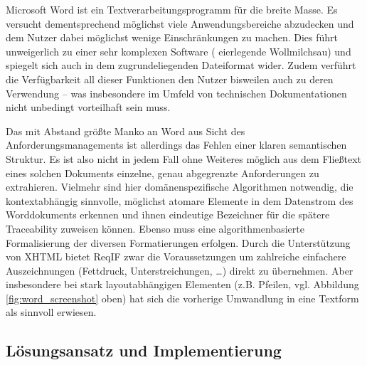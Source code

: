 \documentclass[twoside]{article}
\begin{document}
\begin{multicols}{2}
Microsoft Word ist ein Textverarbeitungsprogramm für die breite Masse. Es versucht dementsprechend möglichst viele Anwendungsbereiche abzudecken und dem Nutzer dabei möglichst wenige Einschränkungen zu machen. Dies führt unweigerlich zu einer sehr komplexen Software (\glqq{} eierlegende Wollmilchsau\grqq{}) und spiegelt sich auch in dem zugrundeliegenden Dateiformat wider. Zudem verführt die Verfügbarkeit all dieser Funktionen den Nutzer bisweilen auch zu deren Verwendung -- was insbesondere im Umfeld von technischen Dokumentationen nicht unbedingt vorteilhaft sein muss.

Das mit Abstand größte Manko an Word aus Sicht des Anforderungsmanagements ist allerdings das Fehlen einer klaren semantischen Struktur. Es ist also nicht in jedem Fall ohne Weiteres möglich aus dem Fließtext eines solchen Dokuments einzelne, genau abgegrenzte Anforderungen zu extrahieren. Vielmehr sind hier domänenspezifische Algorithmen notwendig, die kontextabhängig sinnvolle, möglichst atomare Elemente in dem Datenstrom des Worddokuments erkennen und ihnen eindeutige Bezeichner für die spätere Traceability zuweisen können. Ebenso muss eine algorithmenbasierte Formalisierung der diversen Formatierungen erfolgen. Durch die Unterstützung von XHTML bietet ReqIF zwar die Voraussetzungen um zahlreiche einfachere Auszeichnungen (Fettdruck, Unterstreichungen, \ldots{}) direkt zu übernehmen. Aber insbesondere bei stark layoutabhängigen Elementen (z.B. Pfeilen, vgl. Abbildung \ref{fig:word_screenshot} oben) hat sich die vorherige Umwandlung in eine Textform als sinnvoll erwiesen.

\subsection{Lösungsansatz und Implementierung}



\end{multicols}
\end{document}
